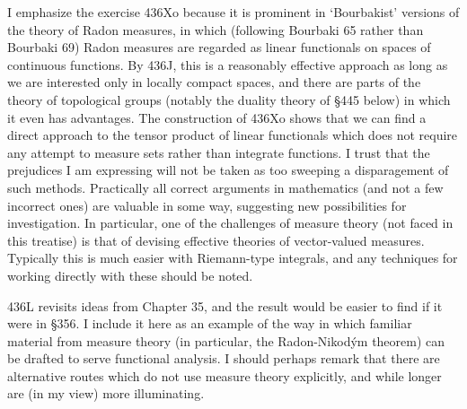 {I emphasize the exercise 436Xo because it is prominent in `Bourbakist' 
versions of the 
theory of Radon measures, in which (following {\smc Bourbaki 65} rather 
than {\smc Bourbaki 69}) Radon measures are regarded as linear 
functionals on spaces of continuous functions.   By 436J, this is a 
reasonably effective approach as long as we are interested only in 
locally compact spaces, and there are parts of the theory of topological 
groups (notably the duality theory of \S445 below) in which it even has 
advantages.   The construction of 436Xo shows that we can find a direct 
approach to the tensor product of linear functionals which does not 
require any attempt to measure sets rather than integrate functions. 
I trust that the prejudices I am 
expressing will not be taken as too sweeping a disparagement of 
such methods.   Practically all correct arguments in mathematics (and 
not a few incorrect ones) are valuable in some way, suggesting new 
possibilities for investigation.   In particular, one of the challenges 
of measure theory (not faced in this treatise) is that of devising 
effective theories of vector-valued measures.   Typically this is much 
easier with Riemann-type integrals, and any techniques for working 
directly with these should be noted. 
      
436L revisits ideas from Chapter 35, and the result would be easier to 
find if it were in \S356.   I include it here as an example of the way 
in which familiar material from measure theory (in particular, the 
Radon-Nikod\'ym theorem) can be drafted to serve functional analysis. 
I should perhaps remark that there are alternative routes which do not 
use measure theory explicitly, and while longer are (in my view) more 
illuminating. 
}%
      
\discrpage 
      
      
